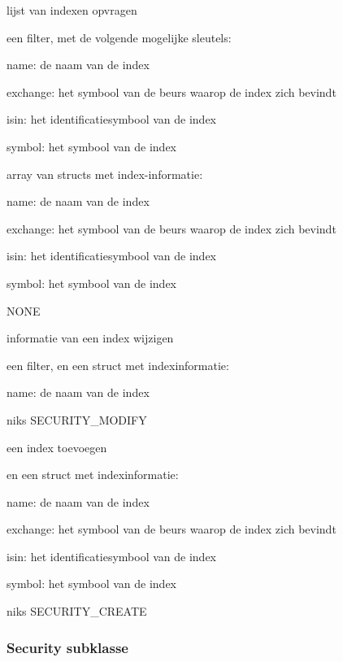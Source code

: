 	{ lijst van indexen opvragen }
	{ een filter, met de volgende mogelijke sleutels:
		\begin{itemize_compact}
		\item{name: de naam van de index}
		\item{exchange: het symbool van de beurs waarop de index zich bevindt}
		\item{isin: het identificatiesymbool van de index}
		\item{symbol: het symbool van de index}
		\end{itemize_compact} }
	{ array van structs met index-informatie:
		\begin{itemize_compact}
		\item{name: de naam van de index}
		\item{exchange: het symbool van de beurs waarop de index zich bevindt}
		\item{isin: het identificatiesymbool van de index}
		\item{symbol: het symbool van de index}
		\end{itemize_compact} }
	{ NONE }

	{ informatie van een index wijzigen }
	{ een filter, en een struct met indexinformatie:
		\begin{itemize_compact}
		\item{name: de naam van de index}
		\end{itemize_compact} }
	{ niks }
	{ SECURITY\_MODIFY }

	{ een index toevoegen }
	{ en een struct met indexinformatie:
		\begin{itemize_compact}
		\item{name: de naam van de index}
		\item{exchange: het symbool van de beurs waarop de index zich bevindt}
		\item{isin: het identificatiesymbool van de index}
		\item{symbol: het symbool van de index}
		\end{itemize_compact} }
	{ niks }
	{ SECURITY\_CREATE }


\subsubsection{Security subklasse}

